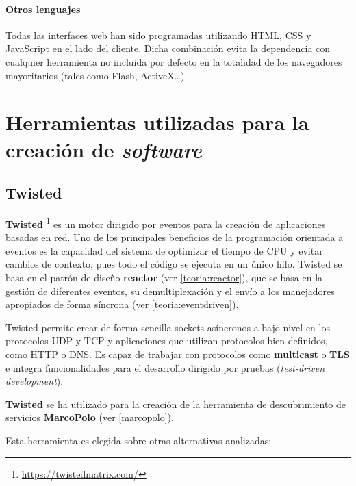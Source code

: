 \paragraph{Otros lenguajes\\}

Todas las interfaces web han sido programadas utilizando HTML, CSS y JavaScript en el lado del cliente. Dicha combinación evita la dependencia con cualquier herramienta no incluida por defecto en la totalidad de los navegadores mayoritarios (tales como Flash, ActiveX\dots).

\section{Herramientas utilizadas para la creación de \textit{software}}

\subsection{Twisted}

\textbf{Twisted} \footnote{\href{https://twistedmatrix.com/}{https://twistedmatrix.com/}} es un motor dirigido por eventos para la creación de aplicaciones basadas en red. Uno de los principales beneficios de la programación orientada a eventos es la capacidad del sistema de optimizar el tiempo de CPU y evitar cambios de contexto, pues todo el código se ejecuta en un único hilo. Twisted se basa en el patrón de diseño \textbf{reactor} (ver \ref{teoria:reactor}), que se basa en la gestión de diferentes eventos, su demultiplexación y el envío a los manejadores apropiados de forma síncrona (ver \ref{teoria:eventdriven}).

Twisted permite crear de forma sencilla sockets asíncronos a bajo nivel en los protocolos UDP y TCP y aplicaciones que utilizan protocolos bien definidos, como HTTP o DNS. Es capaz de trabajar con protocolos como \textbf{multicast} o \textbf{TLS} e integra funcionalidades para el desarrollo dirigido por pruebas (\textit{test-driven development}).

\textbf{Twisted} se ha utilizado para la creación de la herramienta de descubrimiento de servicios \textbf{MarcoPolo} (ver \ref{marcopolo}).

Esta herramienta es elegida sobre otras alternativas analizadas:

